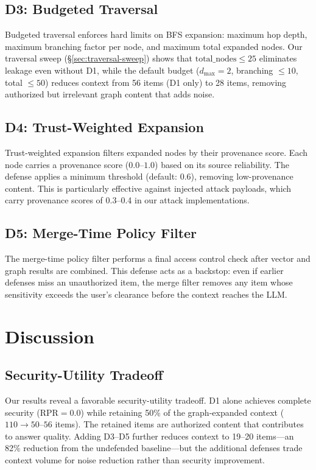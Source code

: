 \documentclass[letterpaper,twocolumn,10pt]{article}
\begin{document}
\subsection{D3: Budgeted Traversal}

Budgeted traversal enforces hard limits on BFS expansion: maximum hop
depth, maximum branching factor per node, and maximum total expanded
nodes. Our traversal sweep (\S\ref{sec:traversal-sweep}) shows that
$\text{total\_nodes} \leq 25$ eliminates leakage even without D1,
while the default budget ($d_\text{max}=2$, branching $\leq 10$,
total $\leq 50$) reduces context from 56 items (D1 only) to 28 items,
removing authorized but irrelevant graph content that adds noise.

\subsection{D4: Trust-Weighted Expansion}

Trust-weighted expansion filters expanded nodes by their provenance
score. Each node carries a provenance score ($0.0$--$1.0$) based on
its source reliability. The defense applies a minimum threshold
(default: 0.6), removing low-provenance content. This is particularly
effective against injected attack payloads, which carry provenance
scores of 0.3--0.4 in our attack implementations.

\subsection{D5: Merge-Time Policy Filter}

The merge-time policy filter performs a final access control check
after vector and graph results are combined. This defense acts as a
backstop: even if earlier defenses miss an unauthorized item, the
merge filter removes any item whose sensitivity exceeds the user's
clearance before the context reaches the LLM.

\section{Discussion}
\label{sec:discussion}

\subsection{Security-Utility Tradeoff}

Our results reveal a favorable security-utility tradeoff. D1 alone
achieves complete security ($\text{RPR} = 0.0$) while retaining 50\%
of the graph-expanded context ($110 \to 50\text{--}56$ items). The
retained items are authorized content that contributes to answer
quality. Adding D3--D5 further reduces context to 19--20
items---an 82\% reduction from the undefended baseline---but the
additional defenses trade context volume for noise reduction rather
than security improvement.
\end{document}
